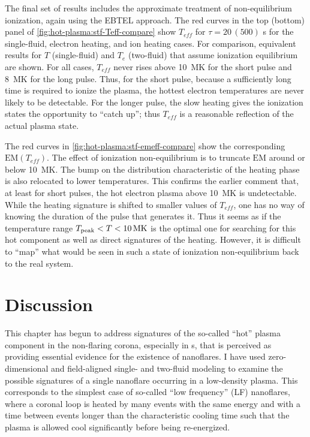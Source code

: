 The final set of results includes the approximate treatment of non-equilibrium ionization, again using the EBTEL approach. The red curves in the top (bottom) panel of \autoref{fig:hot-plasma:stf-Teff-compare} show $T_{eff}$ for $\tau=20\,(500)$ s for the single-fluid, electron heating, and ion heating cases. For comparison, equivalent results for $T$ (single-fluid) and $T_e$ (two-fluid) that assume ionization equilibrium are shown. For all cases, $T_{eff}$ never rises above \SI{10}{\mega\kelvin} for the short pulse and \SI{8}{\mega\kelvin} for the long pulse. Thus, for the short pulse, because a sufficiently long time is required to ionize the plasma, the hottest electron temperatures are never likely to be detectable. For the longer pulse, the slow heating gives the ionization states the opportunity to ``catch up''; thus $T_{eff}$ is a reasonable reflection of the actual plasma state.

The red curves in \autoref{fig:hot-plasma:stf-emeff-compare} show the corresponding $\mathrm{EM}(T_{eff})$. The effect of ionization non-equilibrium is to truncate  $\mathrm{EM}$ around or below \SI{10}{\mega\kelvin}. The bump on the distribution characteristic of the heating phase is also relocated to lower temperatures. This confirms the earlier comment that, at least for short pulses, the hot electron plasma above \SI{10}{\mega\kelvin} is undetectable. While the heating signature is shifted to smaller values of $T_{eff}$, one has no way of knowing the duration of the pulse that generates it. Thus it seems as if the temperature range $T_\textup{peak}<T<\SI{10}{\mega\kelvin}$ is the optimal one for searching for this hot component as well as direct signatures of the heating. However, it is difficult to ``map'' what would be seen in such a state of ionization non-equilibrium back to the real system.

\section{Discussion}\label{hot-plasma:sec:discussion}

This chapter has begun to address signatures of the so-called ``hot'' plasma component in the non-flaring corona, especially in \AR{} s, that is perceived as providing essential evidence for the existence of nanoflares. I have used zero-dimensional and field-aligned single- and two-fluid modeling to examine the possible signatures of a single nanoflare occurring in a low-density plasma. This corresponds to the simplest case of so-called ``low frequency'' (LF) nanoflares, where a coronal loop is heated by many events with the same energy and with a time between events longer than the characteristic cooling time such that the plasma is allowed cool significantly before being re-energized.

